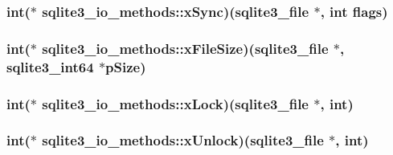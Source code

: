 \hypertarget{structsqlite3__io__methods_8d39ac02aeb1eb63622008217031b098}{
\subsubsection[xSync]{\setlength{\rightskip}{0pt plus 5cm}int($\ast$ {\bf sqlite3\_\-io\_\-methods::xSync})({\bf sqlite3\_\-file} $\ast$, int flags)}}
\label{structsqlite3__io__methods_8d39ac02aeb1eb63622008217031b098}


\hypertarget{structsqlite3__io__methods_d269e3cbda39d0a2383aef13b60b02f8}{
\subsubsection[xFileSize]{\setlength{\rightskip}{0pt plus 5cm}int($\ast$ {\bf sqlite3\_\-io\_\-methods::xFileSize})({\bf sqlite3\_\-file} $\ast$, {\bf sqlite3\_\-int64} $\ast$pSize)}}
\label{structsqlite3__io__methods_d269e3cbda39d0a2383aef13b60b02f8}


\hypertarget{structsqlite3__io__methods_3e4749687788b89ed0f672db7a4f6ac8}{
\subsubsection[xLock]{\setlength{\rightskip}{0pt plus 5cm}int($\ast$ {\bf sqlite3\_\-io\_\-methods::xLock})({\bf sqlite3\_\-file} $\ast$, int)}}
\label{structsqlite3__io__methods_3e4749687788b89ed0f672db7a4f6ac8}


\hypertarget{structsqlite3__io__methods_c90eeb9153eb6608a1872760660e718f}{
\subsubsection[xUnlock]{\setlength{\rightskip}{0pt plus 5cm}int($\ast$ {\bf sqlite3\_\-io\_\-methods::xUnlock})({\bf sqlite3\_\-file} $\ast$, int)}}
\label{structsqlite3__io__methods_c90eeb9153eb6608a1872760660e718f}


